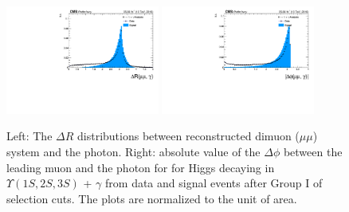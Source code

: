 \begin{figure}[!htbp]
\begin{center}
\includegraphics[width=0.45\textwidth]{figures/outputPlots/HtoUpsilon_Cat0_ZZZZZ/au/data_x_mc/noKinCuts/h_noKin_deltaR_Upsilon_Photon}\hspace*{1.cm}
\includegraphics[width=0.45\textwidth]{figures/outputPlots/HtoUpsilon_Cat0_ZZZZZ/au/data_x_mc/noKinCuts/h_noKin_deltaPhi_Upsilon_Photon}\end{center}\vspace*{-.5cm}
\caption{Left: The $\Delta R$ distributions between reconstructed dimuon ($\mu\mu$) system and the photon. Right: absolute value of the $\Delta \phi$ between the leading muon and the photon for for Higgs decaying in $\Upsilon(1S,2S,3S)$ + $\gamma$ from data and signal events after Group I of selection cuts. The plots are normalized to the unit of area.}
\label{fig:deltaRdeltaPhi_ZtoUpsilon_Cat0}
\end{figure}

